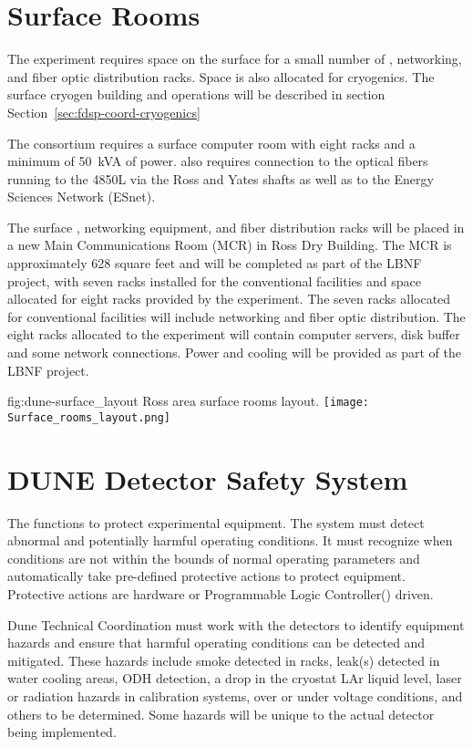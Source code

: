 \section{Surface Rooms}
\label{sec:fdsp-coord-surf-rooms}

The  experiment requires space on the surface for a small
number of , networking, and fiber optic distribution racks.  Space
is also allocated for cryogenics.  The surface cryogen building and
operations will be described in section
Section~\ref{sec:fdsp-coord-cryogenics}

The  consortium requires a surface computer room with eight
racks and a minimum of 50~kVA of power.   also requires connection
to the optical fibers running to the 4850L via the Ross and Yates
shafts as well as to the Energy Sciences Network (ESnet).

The surface , networking equipment, and fiber distribution racks
will be placed in a new Main Communications Room (MCR) in Ross Dry
Building.  The MCR is approximately 628 square feet and will be
completed as part of the LBNF project, with seven racks installed for
the conventional facilities and space allocated for eight racks
provided by the experiment.  The seven racks allocated for
conventional facilities will include networking and fiber optic
distribution.  The eight racks allocated to the experiment will
contain computer servers, disk buffer and some network connections.
Power and cooling will be provided as part of the LBNF project.
\begin{dunefigure}{fig:dune-surface_layout}
  {Ross area surface rooms layout.}
  \texttt{[image: Surface\_rooms\_layout.png]}
\end{dunefigure}


\section{DUNE Detector Safety System}
\label{sec:fdsp-coord-det-safety}


The  functions to
protect experimental equipment.  The system must detect abnormal and
potentially harmful operating conditions.  It must recognize when
conditions are not within the bounds of normal operating parameters
and automatically take pre-defined protective actions to protect
equipment.  Protective actions are hardware or Programmable Logic
Controller() driven.

Dune Technical Coordination must work with the detectors to identify
equipment hazards and ensure that harmful operating conditions can be
detected and mitigated.  These hazards include smoke detected in
racks, leak(s) detected in water cooling areas, ODH detection, a drop
in the cryostat LAr liquid level, laser or radiation hazards in
calibration systems, over or under voltage conditions, and others to
be determined.  Some hazards will be unique to the actual detector
being implemented.

